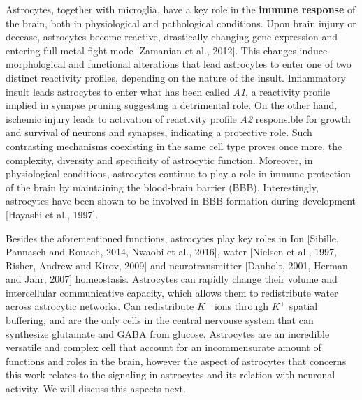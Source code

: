 Astrocytes, together with microglia, have a key role in the \textbf{immune response} of the brain, both in physiological and pathological conditions.
Upon brain injury or decease, astrocytes become reactive, drastically changing gene expression and entering full metal fight mode [Zamanian et al., 2012].
This changes induce morphological and functional alterations that lead astrocytes to enter one of two distinct reactivity profiles, depending on the nature of the insult. 
Inflammatory insult leads astrocytes to enter what has been called \textit{A1}, a reactivity profile implied in synapse pruning suggesting a detrimental role.
On the other hand, ischemic injury leads to activation of reactivity profile \textit{A2} responsible for growth and survival of neurons and synapses, indicating a protective role. 
Such contrasting mechanisms coexisting in the same cell type proves once more, the complexity, diversity and specificity of astrocytic function. 
Moreover, in physiological conditions, astrocytes continue to play a role in immune protection of the brain by maintaining the blood-brain barrier (BBB). 
Interestingly, astrocytes have been shown to be involved in BBB formation during development [Hayashi et al., 1997]. 

Besides the aforementioned functions, astrocytes play key roles in Ion [Sibille, Pannasch and Rouach, 2014, Nwaobi et al., 2016], water [Nielsen et al., 1997, Risher, Andrew and Kirov, 2009] and neurotransmitter [Danbolt, 2001, Herman and Jahr, 2007] homeostasis. 
Astrocytes can rapidly change their volume and intercellular communicative capacity, which allows them to redistribute water across astrocytic networks.  
Can redistribute $K^+$ ions through $K^+$ spatial buffering, and are the only cells in the central nervouse system that can synthesize glutamate and GABA from glucose. 
Astrocytes are an incredible versatile and complex cell that account for an incommensurate amount of functions and roles in the brain, however the aspect of astrocytes that concerns this work relates to the signaling in astrocytes and its relation with neuronal activity. 
We will discuss this aspects next. 
